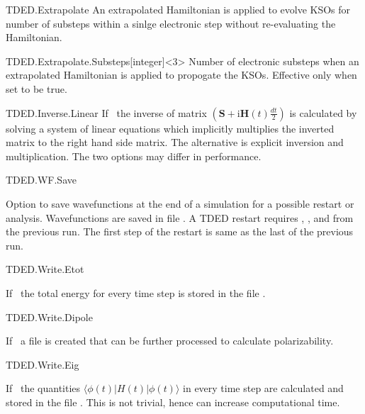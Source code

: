 \begin{fdflogicalF}{TDED.Extrapolate}
  An extrapolated Hamiltonian is applied to evolve KSOs for  number of substeps within a sinlge electronic step without re-evaluating the Hamiltonian.
\end{fdflogicalF}

\begin{fdfentry}{TDED.Extrapolate.Substeps}[integer]<3>
  Number of electronic substeps when an extrapolated Hamiltonian is applied
  to propogate the KSOs. Effective only when  set to be true.
\end{fdfentry}


\begin{fdflogicalT}{TDED.Inverse.Linear}
If \fdftrue\ the inverse of matrix \( \left (\mathbf{S}+\mathrm{i}\mathbf{H}(t)\frac{dt}{2}\right) \) 
  is calculated by solving a system of linear equations which implicitly 
  multiplies the inverted matrix to the right hand side matrix.
  The alternative is explicit inversion and multiplication.
  The two options may differ 
in performance.
\end{fdflogicalT}

  \begin{fdflogicalF}{TDED.WF.Save}

Option to save wavefunctions at the end of a simulation for a possible restart 
or analysis. Wavefunctions are saved in file . 
A TDED restart requires , , and  from the previous run. 
The first step of the restart is same as the last of the previous run.
\end{fdflogicalF}

 \begin{fdflogicalT}{ TDED.Write.Etot}

If \fdftrue\ the total energy for every time step is stored in the file
.

\end{fdflogicalT}

 \begin{fdflogicalF}{TDED.Write.Dipole}

If \fdftrue\ a file  is created that can be
further processed to calculate polarizability.

\end{fdflogicalF}

 \begin{fdflogicalF}{TDED.Write.Eig}

If \fdftrue\ the quantities $\langle \phi(t)|H(t)|\phi(t)\rangle$ in every
time step are calculated and stored in the file
. This is not trivial, hence can increase computational time. 

\end{fdflogicalF}

